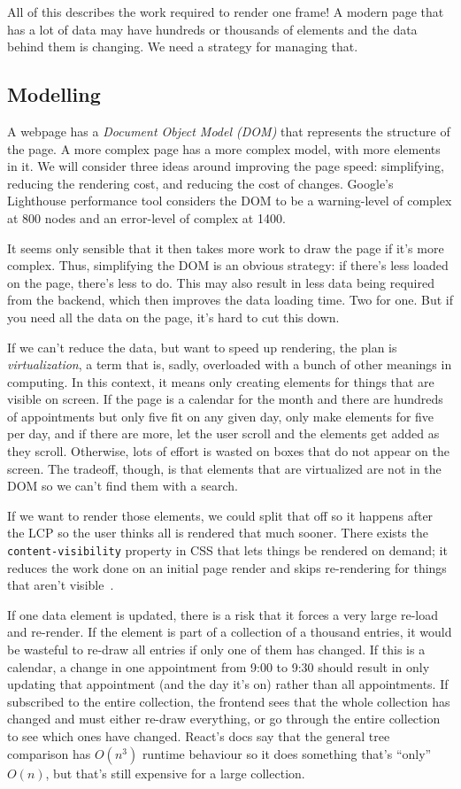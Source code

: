 All of this describes the work required to render one frame! A modern page that has a lot of data may have hundreds or thousands of elements and the data behind them is changing. We need a strategy for managing that.

\subsection*{Modelling}
A webpage has a \textit{Document Object Model (DOM)} that represents the structure of the page. A more complex page has a more complex model, with more elements in it. We will consider three ideas around improving the page speed: simplifying, reducing the rendering cost, and reducing the cost of changes. Google's Lighthouse performance tool considers the DOM to be a warning-level of complex at 800 nodes and an error-level of complex at 1400.

It seems only sensible that it then takes more work to draw the page if it's more complex. Thus, simplifying the DOM is an obvious strategy: if there's less loaded on the page, there's less to do. This may also result in less data being required from the backend, which then improves the data loading time. Two for one. But if you need all the data on the page, it's hard to cut this down.

If we can't reduce the data, but want to speed up rendering, the plan is \textit{virtualization}, a term that is, sadly, overloaded with a bunch of other meanings in computing. In this context, it means only creating elements for things that are visible on screen. If the page is a calendar for the month and there are hundreds of appointments but only five fit on any given day, only make elements for  five per day, and if there are more, let the user scroll and the elements get added as they scroll. Otherwise, lots of effort is wasted on boxes that do not appear on the screen. The tradeoff, though, is that elements that are virtualized are not in the DOM so we can't find them with a search. 

If we want to render those elements, we could split that off so it happens after the LCP so the user thinks all is rendered that much sooner. There exists the \texttt{content-visibility} property in CSS that lets things be rendered on demand; it reduces the work done on an initial page render and skips re-rendering for things that aren't visible~\cite{domsize}.

If one data element is updated, there is a risk that it forces a very large re-load and re-render. If the element is part of a collection of a thousand entries, it would be wasteful to re-draw all entries if only one of them has changed. If this is a calendar, a change in one appointment from 9:00 to 9:30 should result in only updating that appointment (and the day it's on) rather than all appointments. If subscribed to the entire collection, the frontend sees that the whole collection has changed and must either re-draw everything, or go through the entire collection to see which ones have changed. React's docs say that the general tree comparison has $O(n^{3})$ runtime behaviour so it does something that's ``only'' $O(n)$, but that's still expensive for a large collection.


